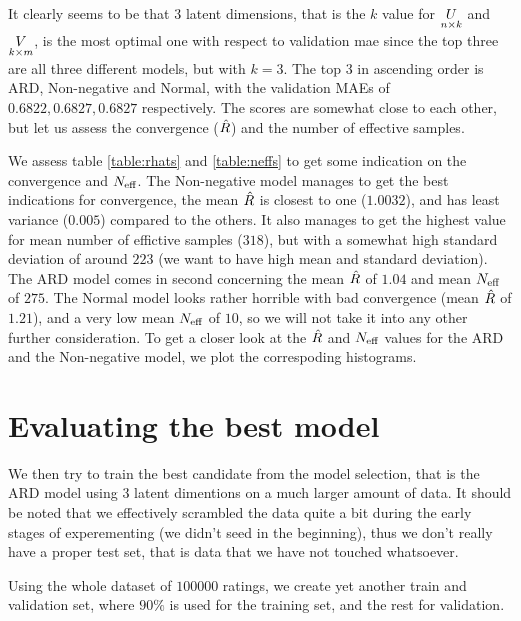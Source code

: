 \documentclass[12pt]{article}
\begin{document}
    It clearly seems to be that $3$ latent dimensions, that is the $k$ value for $\underset{n \times k}{U}$ and $\underset{k \times m}{V}$, is the most optimal one with respect to validation mae since the top three are all three different models, but with $k=3$. The top 3 in ascending order is ARD, Non-negative and Normal, with the validation MAEs of $0.6822, 0.6827, 0.6827$ respectively. The scores are somewhat close to each other, but let us assess the convergence ($\hat{R}$) and the number of effective samples. 

    \vspace{3mm}
    We assess table \ref{table:rhats} and \ref{table:neffs} to get some indication on the convergence and $N_{\text{eff}}$. The Non-negative model manages to get the best indications for convergence, the mean $\hat{R}$ is closest to one ($1.0032$), and has least variance ($0.005$) compared to the others. It also manages to get the highest value for mean number of effictive samples ($318$), but with a somewhat high standard deviation of around $223$ (we want to have high mean and standard deviation). The ARD model comes in second concerning the mean $\hat{R}$ of $1.04$ and mean $N_{\text{eff}}$ of $275$. The Normal model looks rather horrible with bad convergence (mean $\hat{R}$ of $1.21$), and a very low mean $N_{\text{eff}}$ of $10$, so we will not take it into any other further consideration. To get a closer look at the $\hat{R}$ and $N_{\text{eff}}$ values for the ARD and the Non-negative model, we plot the correspoding histograms.

\section{Evaluating the best model}
We then try to train the best candidate from the model selection, that is the ARD model using $3$ latent dimentions on a much larger amount of data. It should be noted that we effectively scrambled the data quite a bit during the early stages of experementing (we didn't seed in the beginning), thus we don't really have a proper test set, that is data that we have not touched whatsoever.

\vspace{5mm}
Using the whole dataset of $100000$ ratings, we create yet another train and validation set, where $90\%$ is used for the training set, and the rest for validation.
\end{document}
